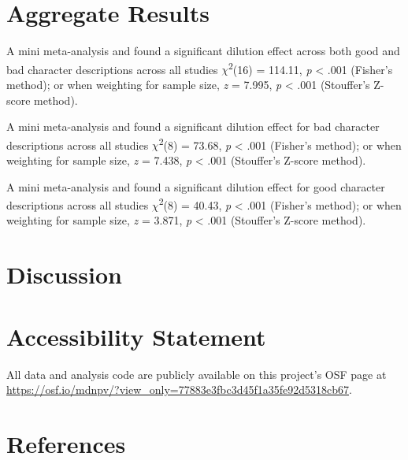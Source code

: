 \documentclass[
  man,floatsintext]{apa6}
\begin{document}
\newpage

\section{Aggregate Results}\label{aggregate-results}

A mini meta-analysis and found a significant dilution effect across both good and bad character descriptions across all studies \(\chi\)\textsuperscript{2}(16) = 114.11, \emph{p} \textless{} .001 (Fisher's method); or when weighting for sample size, \emph{z} = 7.995, \emph{p} \textless{} .001 (Stouffer's Z-score method).

A mini meta-analysis and found a significant dilution effect for bad character descriptions across all studies \(\chi\)\textsuperscript{2}(8) = 73.68, \emph{p} \textless{} .001 (Fisher's method); or when weighting for sample size, \emph{z} = 7.438, \emph{p} \textless{} .001 (Stouffer's Z-score method).

A mini meta-analysis and found a significant dilution effect for good character descriptions across all studies \(\chi\)\textsuperscript{2}(8) = 40.43, \emph{p} \textless{} .001 (Fisher's method); or when weighting for sample size, \emph{z} = 3.871, \emph{p} \textless{} .001 (Stouffer's Z-score method).

\section{Discussion}\label{discussion}

\section{Accessibility Statement}\label{accessibility-statement}

All data and analysis code are publicly available on this project's OSF page at \color{blue}\url{https://osf.io/mdnpv/?view_only=77883e3fbc3d45f1a35fe92d5318cb67}\color{black}.

\newpage

\section{References}\label{references}
\end{document}

